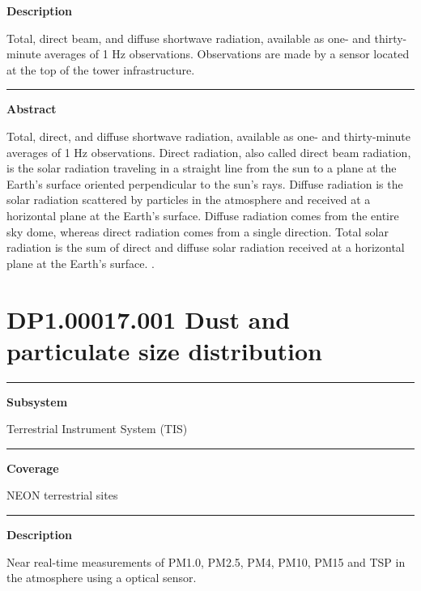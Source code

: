 \documentclass[]{article}
\begin{document}
\textbf{Description}

Total, direct beam, and diffuse shortwave radiation, available as one-
and thirty-minute averages of 1 Hz observations. Observations are made
by a sensor located at the top of the tower infrastructure.

\begin{center}\rule{0.5\linewidth}{\linethickness}\end{center}

\textbf{Abstract}

Total, direct, and diffuse shortwave radiation, available as one- and
thirty-minute averages of 1 Hz observations. Direct radiation, also
called direct beam radiation, is the solar radiation traveling in a
straight line from the sun to a plane at the Earth's surface oriented
perpendicular to the sun's rays. Diffuse radiation is the solar
radiation scattered by particles in the atmosphere and received at a
horizontal plane at the Earth's surface. Diffuse radiation comes from
the entire sky dome, whereas direct radiation comes from a single
direction. Total solar radiation is the sum of direct and diffuse solar
radiation received at a horizontal plane at the Earth's surface.
\newpage
.

\section{DP1.00017.001 Dust and particulate size
distribution}\label{dp1.00017.001-dust-and-particulate-size-distribution}

\begin{center}\rule{0.5\linewidth}{\linethickness}\end{center}

\textbf{Subsystem}

Terrestrial Instrument System (TIS)

\begin{center}\rule{0.5\linewidth}{\linethickness}\end{center}

\textbf{Coverage}

NEON terrestrial sites

\begin{center}\rule{0.5\linewidth}{\linethickness}\end{center}

\textbf{Description}

Near real-time measurements of PM1.0, PM2.5, PM4, PM10, PM15 and TSP in
the atmosphere using a optical sensor.
\end{document}
